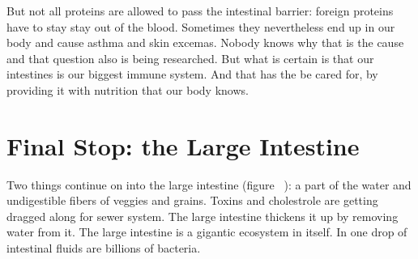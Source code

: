 \documentclass[../main.tex]{subfiles}
\begin{document}
But not all proteins are allowed to pass the intestinal barrier: foreign proteins have to stay stay out of the blood.
Sometimes they nevertheless end up in our body and cause asthma and skin excemas.
Nobody knows why that is the cause and that question also is being researched.
But what is certain is that our intestines is our biggest immune system.
And that has the be cared for, by providing it with nutrition that our body knows.

\section{Final Stop: the Large Intestine}

Two things continue on into the large intestine (figure~%
): a part of the water and undigestible fibers of veggies and grains. 
Toxins and cholestrole are getting dragged along for sewer system.
The large intestine thickens it up by removing water from it.
The large intestine is a gigantic ecosystem in itself.
In one drop of intestinal fluids are billions of bacteria. 
\end{document}
